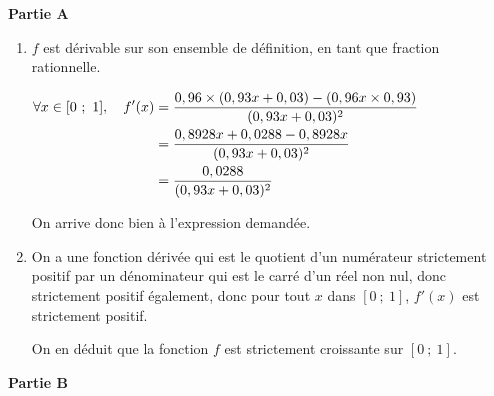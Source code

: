 
\medskip

\textbf{Partie A}

\smallskip

\begin{enumerate}
	\item $f$ est dérivable sur son ensemble de définition, en tant que fraction rationnelle.

$\aligned[t] \forall x \in [0~;~1],\quad f'(x) &= \dfrac{0,96 \times (0,93 x + 0,03) - (0,96x \times 0,93)}{(0,93x + 0,03)^2}\\
&=\dfrac{0,8928 x + 0,0288 - 0,8928 x}{(0,93x + 0,03)^2}\\
&=\dfrac{0,0288}{(0,93x + 0,03)^2}\endaligned$

On arrive donc bien à l'expression demandée.

	\item On a une fonction dérivée qui est le quotient d'un numérateur strictement positif par un dénominateur qui est le carré d'un réel non nul, donc strictement positif également, donc pour tout $x$ dans $ [0~;~1] $, $f'(x)$ est strictement positif.

On en déduit que la fonction $f$ est strictement croissante sur $ [0~;~1] $.
	\end{enumerate}

	\bigskip

	\textbf{Partie B}

	\smallskip

